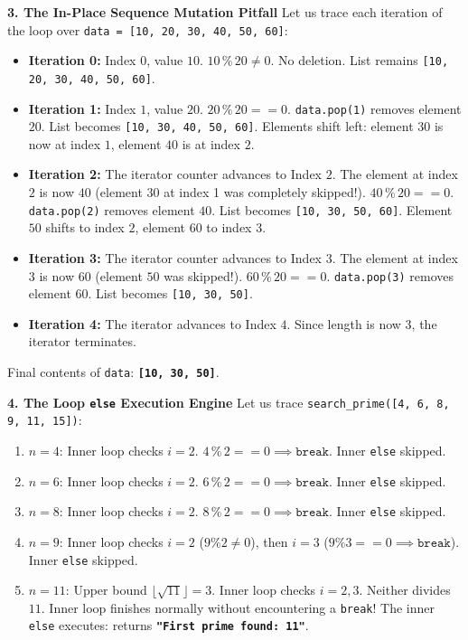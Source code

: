 \textbf{3. The In-Place Sequence Mutation Pitfall}
Let us trace each iteration of the loop over \texttt{data = [10, 20, 30, 40, 50, 60]}:
\begin{itemize}
    \item \textbf{Iteration 0:} Index $0$, value $10$. $10 \mathbin{\%} 20 \neq 0$. No deletion. List remains \texttt{[10, 20, 30, 40, 50, 60]}.
    \item \textbf{Iteration 1:} Index $1$, value $20$. $20 \mathbin{\%} 20 == 0$. \texttt{data.pop(1)} removes element $20$.
    List becomes \texttt{[10, 30, 40, 50, 60]}. Elements shift left: element $30$ is now at index $1$, element $40$ is at index $2$.
    \item \textbf{Iteration 2:} The iterator counter advances to Index $2$.
    The element at index $2$ is now $40$ (element $30$ at index 1 was completely skipped!).
    $40 \mathbin{\%} 20 == 0$. \texttt{data.pop(2)} removes element $40$.
    List becomes \texttt{[10, 30, 50, 60]}. Element $50$ shifts to index $2$, element $60$ to index $3$.
    \item \textbf{Iteration 3:} The iterator counter advances to Index $3$.
    The element at index $3$ is now $60$ (element $50$ was skipped!).
    $60 \mathbin{\%} 20 == 0$. \texttt{data.pop(3)} removes element $60$.
    List becomes \texttt{[10, 30, 50]}.
    \item \textbf{Iteration 4:} The iterator advances to Index $4$. Since length is now 3, the iterator terminates.
\end{itemize}
Final contents of \texttt{data}: \textbf{\texttt{[10, 30, 50]}}.

\textbf{4. The Loop \texttt{else} Execution Engine}
Let us trace \texttt{search\_prime([4, 6, 8, 9, 11, 15])}:
\begin{enumerate}
    \item $n = 4$: Inner loop checks $i = 2$. $4 \mathbin{\%} 2 == 0 \implies \texttt{break}$. Inner \texttt{else} skipped.
    \item $n = 6$: Inner loop checks $i = 2$. $6 \mathbin{\%} 2 == 0 \implies \texttt{break}$. Inner \texttt{else} skipped.
    \item $n = 8$: Inner loop checks $i = 2$. $8 \mathbin{\%} 2 == 0 \implies \texttt{break}$. Inner \texttt{else} skipped.
    \item $n = 9$: Inner loop checks $i = 2$ ($9 \% 2 \neq 0$), then $i = 3$ ($9 \% 3 == 0 \implies \texttt{break}$). Inner \texttt{else} skipped.
    \item $n = 11$: Upper bound $\lfloor \sqrt{11} \rfloor = 3$. Inner loop checks $i = 2, 3$. Neither divides $11$.
    Inner loop finishes normally without encountering a \texttt{break}!
    The inner \texttt{else} executes: returns \textbf{\texttt{"First prime found: 11"}}.
\end{enumerate}


